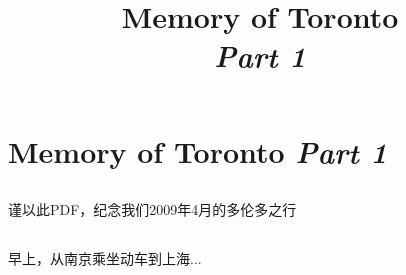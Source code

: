 ﻿\documentclass[hyperref={bookmarks=true},xcolor=pdflatex,svgnames,table,compress]{beamer}
\title{Memory of Toronto\\ \textit{Part 1}}
\author{}
\date{}
\begin{document}
\begin{frame}
\titlepage
\end{frame}

\section{Memory of Toronto {\itshape Part 1}}

\subsection{}
\begin{frame}
\begin{ztebox}
谨以此PDF，纪念我们2009年4月的多伦多之行
\end{ztebox}
\end{frame}

\subsection{}
\begin{frame}
\begin{center}
\end{center}
\end{frame}

\subsection{}
\begin{frame}
\begin{ztebox}
早上，从南京乘坐动车到上海...
\end{ztebox}
\end{frame}



\subsection{}
\begin{frame}
\end{frame}

\subsection{}
\begin{frame}
\end{frame}

\subsection{}
\begin{frame}
\end{frame}
\end{document}
